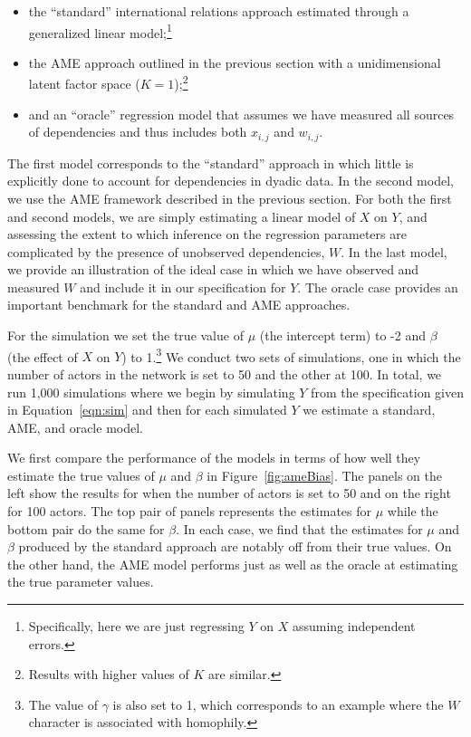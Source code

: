 \documentclass[12pt]{amsart}
\begin{document}
\begin{itemize}
	\item the ``standard'' international relations approach estimated through a generalized linear model;\footnote{Specifically, here we are just regressing $Y$ on $X$ assuming independent errors.}
	\item the AME approach outlined in the previous section with a unidimensional latent factor space ($K=1$);\footnote{Results with higher values of $K$ are similar.}
	\item and an ``oracle'' regression model that assumes we have measured all sources of dependencies and thus includes both $x_{i,j}$ and $w_{i,j}$.
\end{itemize}

The first model corresponds to the ``standard'' approach in which little is explicitly done to account for dependencies in dyadic data. In the second model, we use the AME framework described in the previous section. For both the first and second models, we are simply estimating a linear model of $X$ on $Y$, and assessing the extent to which inference on the regression parameters are complicated by the presence of unobserved dependencies, $W$. In the last model, we provide an illustration of the ideal case in which we have observed and measured $W$ and include it in our specification for $Y$. The oracle case provides an important benchmark for the standard and AME approaches.

For the simulation we set the true value of $\mu$ (the intercept term) to -2 and $\beta$ (the effect of $X$ on $Y$) to 1.\footnote{The value of $\gamma$ is also set to 1, which corresponds to an example where the $W$ character is associated with homophily.} We conduct two sets of simulations, one in which the number of actors in the network is set to 50 and the other at 100. In total, we run 1,000 simulations where we begin by simulating $Y$ from the specification given in Equation~\ref{eqn:sim} and then for each simulated $Y$ we estimate a standard, AME, and oracle model.

We first compare the performance of the models in terms of how well they estimate the true values of $\mu$ and $\beta$ in Figure~\ref{fig:ameBias}. The panels on the left show the results for when the number of actors is set to 50 and on the  right for 100 actors. The top pair of panels represents the estimates for $\mu$ while the bottom pair do the same for $\beta$. In each case, we find that the estimates for $\mu$ and $\beta$ produced by the standard approach are notably off from their true values. On the other hand, the AME model performs just as well as the oracle at estimating the true parameter values.
\end{document}
